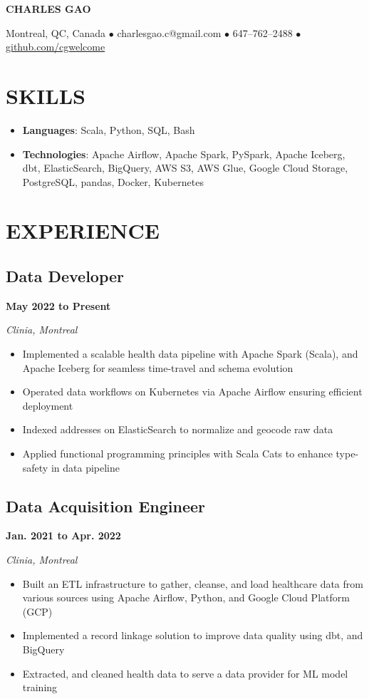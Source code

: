\documentclass[12pt]{extarticle}
\begin{document}
\begin{center}
\textbf{\huge{CHARLES GAO}}

Montreal, QC, Canada
$\bullet$ charlesgao.c@gmail.com
$\bullet$ 647--762--2488
$\bullet$ \href{https://github.com/cgwelcome}{github.com/cgwelcome}
\end{center}

\section*{SKILLS}
\begin{itemize}
  \item \textbf{Languages}: Scala, Python, SQL, Bash
  \item \textbf{Technologies}: Apache Airflow, Apache Spark, PySpark, Apache Iceberg, dbt, ElasticSearch, BigQuery, AWS S3, AWS Glue, Google Cloud Storage, PostgreSQL, pandas, Docker, Kubernetes
\end{itemize}



\section*{EXPERIENCE}

\subsection*{Data Developer} \hfill \textbf{May 2022 to Present}

\textit{Clinia, Montreal}
\begin{itemize}
	\item Implemented a scalable health data pipeline with Apache Spark (Scala), and Apache Iceberg for seamless time-travel and schema evolution
  \item Operated data workflows on Kubernetes via Apache Airflow ensuring efficient deployment
  \item Indexed addresses on ElasticSearch to normalize and geocode raw data
  \item Applied functional programming principles with Scala Cats to enhance type-safety in data pipeline
\end{itemize}

\subsection*{Data Acquisition Engineer} \hfill \textbf{Jan. 2021 to Apr. 2022}

\textit{Clinia, Montreal}
\begin{itemize}
  \item Built an ETL infrastructure to gather, cleanse, and load healthcare data from various sources using Apache Airflow, Python, and Google Cloud Platform (GCP)
  \item Implemented a record linkage solution to improve data quality using dbt, and BigQuery
  \item Extracted, and cleaned health data to serve a data provider for ML model training
\end{itemize}
\end{document}
